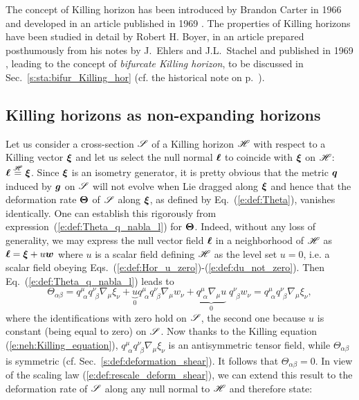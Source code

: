 \begin{hist}
The concept of Killing horizon has been introduced by Brandon Carter in
1966 \cite{Carte66,Carte67} and developed in an article published in
1969 \cite{Carte69}. The properties of Killing horizons have been
studied in detail by Robert H. Boyer,
in an article prepared posthumously from his notes
by J.~Ehlers and J.L.~Stachel and published in 1969 \cite{Boyer69},
leading to the concept of \emph{bifurcate Killing horizon}, to be discussed in
Sec.~\ref{s:sta:bifur_Killing_hor} (cf. the historical note on p.~\pageref{h:sta:Boyer}).
\end{hist}

\subsection{Killing horizons as non-expanding horizons}

Let us consider a cross-section $\mathscr{S}$ of a Killing horizon $\mathscr{H}$ with respect to a Killing vector $\bm{\xi}$
and let us select the null normal $\bm{\ell}$ to coincide with $\bm{\xi}$ on $\mathscr{H}$:
$\bm{\ell} \stackrel{\mathscr{H}}{=} \bm{\xi}$. Since $\bm{\xi}$ is an isometry generator, it is pretty obvious that the
metric $\bm{q}$ induced by $\bm{g}$ on $\mathscr{S}$ will not evolve when Lie dragged along $\bm{\xi}$ and
hence that the deformation rate $\bm{\Theta}$ of $\mathscr{S}$ along $\bm{\xi}$, as defined by
Eq.~(\ref{e:def:Theta}), vanishes identically.
One can establish this rigorously from expression~(\ref{e:def:Theta_q_nabla_l}) for $\bm{\Theta}$.
Indeed, without any loss of generality, we may express
the null vector field $\bm{\ell}$ in a neighborhood of $\mathscr{H}$ as $\bm{\ell} = \bm{\xi} + u \bm{w}$ where $u$ is a scalar field
defining $\mathscr{H}$ as the level set $u=0$, i.e. a scalar field obeying Eqs.~(\ref{e:def:Hor_u_zero})-(\ref{e:def:du_not_zero}). Then Eq.~(\ref{e:def:Theta_q_nabla_l}) leads to
\[
    \Theta_{\alpha\beta}  = q^\mu_{\ \, \alpha} q^\nu_{\ \, \beta} \nabla_\mu \xi_\nu
        + \underbrace{u}_{0} q^\mu_{\ \, \alpha} q^\nu_{\ \, \beta} \nabla_\mu w_\nu
        + \underbrace{q^\mu_{\ \, \alpha} \nabla_\mu u}_{0} \; q^\nu_{\ \, \beta}  w_\nu
        = q^\mu_{\ \, \alpha} q^\nu_{\ \, \beta} \nabla_\mu \xi_\nu ,
\]
where the identifications with zero hold on $\mathscr{S}$, the second one because $u$ is constant (being equal to zero) on
$\mathscr{S}$. Now thanks to the Killing equation (\ref{e:neh:Killing_equation}), $q^\mu_{\ \, \alpha} q^\nu_{\ \, \beta} \nabla_\mu \xi_\nu$ is an antisymmetric tensor field, while $\Theta_{\alpha\beta}$ is symmetric
(cf. Sec.~\ref{s:def:deformation_shear}). It follows that $\Theta_{\alpha\beta}=0$.
In view of the scaling law (\ref{e:def:rescale_deform_shear}), we can extend this result to the deformation rate
of $\mathscr{S}$ along any null normal to $\mathscr{H}$ and therefore state:

